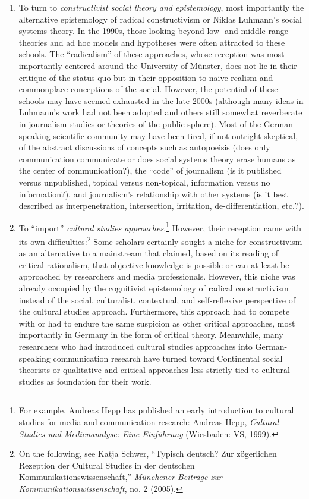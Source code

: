 \documentclass{tufte-handout}
\begin{document}
\begin{enumerate}
\item
  To turn to \emph{constructivist social theory and epistemology}, most
  importantly the alternative epistemology of radical constructivism or
  Niklas Luhmann's social systems theory. In the 1990s, those looking
  beyond low- and middle-range theories and ad hoc models and hypotheses
  were often attracted to these schools. The ``radicalism'' of these
  approaches, whose reception was most importantly centered around the
  University of Münster, does not lie in their critique of the status
  quo but in their opposition to naive realism and commonplace
  conceptions of the social. However, the potential of these schools may
  have seemed exhausted in the late 2000s (although many ideas in
  Luhmann's work had not been adopted and others still somewhat
  reverberate in journalism studies or theories of the public sphere).
  Most of the German-speaking scientific community may have been tired,
  if not outright skeptical, of the abstract discussions of concepts
  such as autopoeisis (does only communication communicate or does
  social systems theory erase humans as the center of communication?),
  the ``code'' of journalism (is it published versus unpublished,
  topical versus non-topical, information versus no information?), and
  journalism's relationship with other systems (is it best described as
  interpenetration, intersection, irritation, de-differentiation,
  etc.?).
\item
  To ``import'' \emph{cultural studies approaches}.\footnote{For
    example, Andreas Hepp has published an early introduction to
    cultural studies for media and communication research: Andreas Hepp,
    \emph{Cultural Studies und Medienanalyse: Eine Einführung}
    (Wiesbaden: VS, 1999).} However, their reception came with its own
  difficulties:\footnote{On the following, see Katja Schwer, ``Typisch
    deutsch? Zur zögerlichen Rezeption der Cultural Studies in der
    deutschen Kommunikationswissenschaft,'' \emph{Münchener Beiträge zur
    Kommunikationswissenschaft}, no. 2 (2005).} Some scholars certainly
  sought a niche for constructivism as an alternative to a mainstream
  that claimed, based on its reading of critical rationalism, that
  objective knowledge is possible or can at least be approached by
  researchers and media professionals. However, this niche was already
  occupied by the cognitivist epistemology of radical constructivism
  instead of the social, culturalist, contextual, and self-reflexive
  perspective of the cultural studies approach. Furthermore, this
  approach had to compete with or had to endure the same suspicion as
  other critical approaches, most importantly in Germany in the form of
  critical theory. Meanwhile, many researchers who had introduced
  cultural studies approaches into German-speaking communication
  research have turned toward Continental social theorists or
  qualitative and critical approaches less strictly tied to cultural
  studies as foundation for their work.
\end{enumerate}
\end{document}
